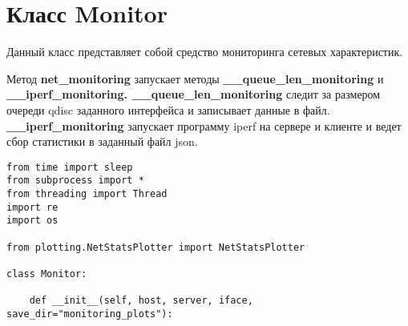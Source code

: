 \chapter{Класс Monitor}
Данный класс представляет собой средство мониторинга сетевых
характеристик.

Метод \textbf{net\_monitoring} запускает методы
\textbf{\_\_queue\_len\_monitoring} и \linebreak \textbf{\_\_iperf\_monitoring.
  \_\_queue\_len\_monitoring} следит за размером очереди qdisc
заданного интерфейса и записывает данные в
файл. \textbf{\_\_iperf\_monitoring} запускает программу iperf на
сервере и клиенте и ведет сбор статистики в заданный файл json.

\begin{verbatim}
from time import sleep
from subprocess import *
from threading import Thread
import re
import os

from plotting.NetStatsPlotter import NetStatsPlotter

class Monitor:

    def __init__(self, host, server, iface, save_dir="monitoring_plots"):


\end{verbatim}
